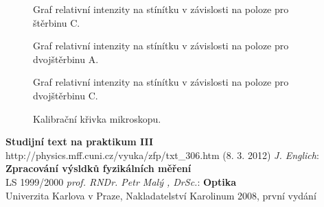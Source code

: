 \documentclass[a4paper,12pt]{article}
\begin{document}
\begin{figure}
\begin{center}

\end{center}
\caption{Graf relativní intenzity na stínítku v závislosti na poloze pro štěrbinu C.}
\label{g3}
\end{figure}

\begin{figure}
\begin{center}

\end{center}
\caption{Graf relativní intenzity na stínítku v závislosti na poloze pro dvojštěrbinu A.}
\label{g4}
\end{figure}

\begin{figure}
\begin{center}

\end{center}
\caption{Graf relativní intenzity na stínítku v závislosti na poloze pro dvojštěrbinu C.}
\label{g5}
\end{figure}

\begin{figure}
\begin{center}

\end{center}
\caption{Kalibrační křivka mikroskopu.}
\label{kal}
\end{figure}


\eject
\begin{thebibliography}{5}
	 \textbf{Studijní text na praktikum III} \\http://physics.mff.cuni.cz/vyuka/zfp/txt\_306.htm (8. 3. 2012)
     \emph{J. Englich}: \textbf{Zpracování výsldků fyzikálních měření} \\ LS 1999/2000
     \emph{prof. RNDr. Petr Malý , DrSc.}: \textbf{Optika}\\Univerzita Karlova v Praze, Nakladatelství Karolinum 2008, první vydání
\end{thebibliography}
\end{document}
